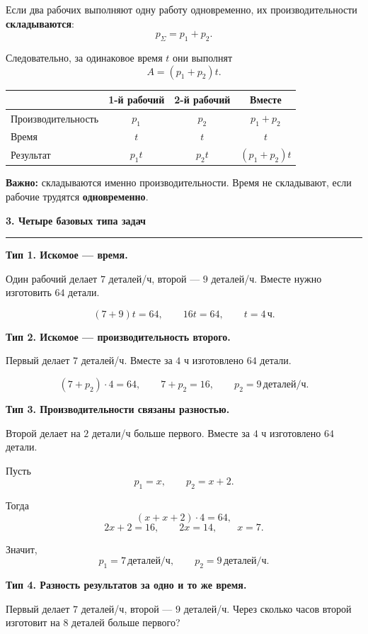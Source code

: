 \documentclass[a4paper,12pt]{article}
\newcommand{\lessonsection}[1]{%
  \vspace{0.35em}
  {\Large\bfseries\textcolor{darkaccent}{#1}}\par
  \vspace{0.2em}
  {\color{accent}\rule{\linewidth}{0.6pt}}\par
  \vspace{0.4em}
}
\newcommand{\keyidea}[1]{\textbf{\textcolor{darkaccent}{#1}}}
\newcommand{\unit}[1]{\,\text{#1}}
\begin{document}
Если два рабочих выполняют одну работу одновременно,
их производительности \textbf{складываются}:
\[
p_{\Sigma}=p_1+p_2.
\]

Следовательно, за одинаковое время $t$ они выполнят
\[
A=(p_1+p_2)t.
\]

\begin{center}
\begin{tabularx}{0.92\linewidth}{@{}Xccc@{}}
\toprule
& \textbf{1-й рабочий} & \textbf{2-й рабочий} & \textbf{Вместе} \\
\midrule
Производительность & $p_1$ & $p_2$ & $p_1+p_2$ \\
Время & $t$ & $t$ & $t$ \\
Результат & $p_1t$ & $p_2t$ & $(p_1+p_2)t$ \\
\bottomrule
\end{tabularx}
\end{center}

\keyidea{Важно:}
складываются именно производительности.
Время не складывают, если рабочие трудятся \textbf{одновременно}.

\lessonsection{3. Четыре базовых типа задач}

\textbf{Тип 1. Искомое --- время.}

Один рабочий делает $7$ деталей/ч, второй --- $9$ деталей/ч.
Вместе нужно изготовить $64$ детали.

\[
(7+9)t=64,
\qquad
16t=64,
\qquad
\boxed{t=4\unit{ч}}.
\]

\textbf{Тип 2. Искомое --- производительность второго.}

Первый делает $7$ деталей/ч.
Вместе за $4$ ч изготовлено $64$ детали.

\[
(7+p_2)\cdot4=64,
\qquad
7+p_2=16,
\qquad
\boxed{p_2=9\unit{деталей/ч}}.
\]

\textbf{Тип 3. Производительности связаны разностью.}

Второй делает на $2$ детали/ч больше первого.
Вместе за $4$ ч изготовлено $64$ детали.

Пусть
\[
p_1=x,
\qquad
p_2=x+2.
\]

Тогда
\[
(x+x+2)\cdot4=64,
\]
\[
2x+2=16,
\qquad
2x=14,
\qquad
x=7.
\]

Значит,
\[
\boxed{p_1=7\unit{деталей/ч}},
\qquad
\boxed{p_2=9\unit{деталей/ч}}.
\]

\textbf{Тип 4. Разность результатов за одно и то же время.}

Первый делает $7$ деталей/ч, второй --- $9$ деталей/ч.
Через сколько часов второй изготовит на $8$ деталей больше первого?
\end{document}
